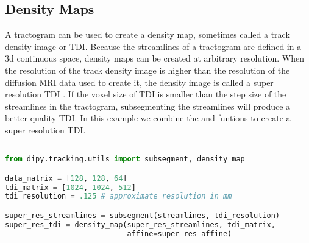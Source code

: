 \subsection{Density Maps}

A tractogram can be used to create a density map, sometimes called a track density image or TDI\cite{Calamante_2010, Calamante_2016}. Because the streamlines of a tractogram are defined in a 3d continuous space, density maps can be created at arbitrary resolution. When the resolution of the track density image is higher than the resolution of the diffusion MRI data used to create it, the density image is called a super resolution TDI \cite{Calamante_2016}. If the voxel size of TDI is smaller than the step size of the streamlines in the tractogram, subsegmenting the streamlines will produce a better quality TDI. In this example we combine the  and  funtions to create a super resolution TDI.

\begin{lstlisting}[language=python]

from dipy.tracking.utils import subsegment, density_map

data_matrix = [128, 128, 64]
tdi_matrix = [1024, 1024, 512]
tdi_resolution = .125 # approximate resolution in mm

super_res_streamlines = subsegment(streamlines, tdi_resolution)
super_res_tdi = density_map(super_res_streamlines, tdi_matrix,
                            affine=super_res_affine)

\end{lstlisting}
